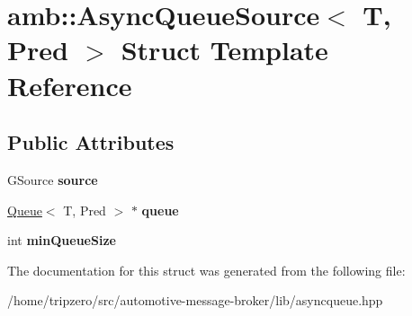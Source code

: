 \hypertarget{structamb_1_1AsyncQueueSource}{\section{amb\-:\-:Async\-Queue\-Source$<$ T, Pred $>$ Struct Template Reference}
\label{structamb_1_1AsyncQueueSource}
}
\subsection*{Public Attributes}
\begin{DoxyCompactItemize}
\item 
\hypertarget{structamb_1_1AsyncQueueSource_a24c5fe3fdd11cfa92ec95ad440966572}{G\-Source {\bfseries source}}\label{structamb_1_1AsyncQueueSource_a24c5fe3fdd11cfa92ec95ad440966572}

\item 
\hypertarget{structamb_1_1AsyncQueueSource_ac43bbfc0e2112f433ef4cb908fb5e8fc}{\hyperlink{classamb_1_1Queue}{Queue}$<$ T, Pred $>$ $\ast$ {\bfseries queue}}\label{structamb_1_1AsyncQueueSource_ac43bbfc0e2112f433ef4cb908fb5e8fc}

\item 
\hypertarget{structamb_1_1AsyncQueueSource_a1659121d3c53ed3aaab7a7fd6226f2ca}{int {\bfseries min\-Queue\-Size}}\label{structamb_1_1AsyncQueueSource_a1659121d3c53ed3aaab7a7fd6226f2ca}

\end{DoxyCompactItemize}


The documentation for this struct was generated from the following file\-:\begin{DoxyCompactItemize}
\item 
/home/tripzero/src/automotive-\/message-\/broker/lib/asyncqueue.\-hpp\end{DoxyCompactItemize}
